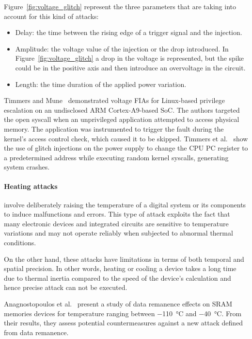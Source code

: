 Figure~\ref{fig:voltage_glitch} represent the three parameters that are taking into account for this kind of attacks:
\begin{itemize}
    \item Delay: the time between the rising edge of a trigger signal and the injection.
    \item Amplitude: the voltage value of the injection or the drop introduced. In Figure~\ref{fig:voltage_glitch} a drop in the voltage is represented, but the spike could be in the positive axis and then introduce an overvoltage in the circuit.
    \item Length: the time duration of the applied power variation.
\end{itemize}

Timmers and Mune~\cite{TM-17-fdtc} demonstrated voltage FIAs for Linux-based privilege escalation on an undisclosed ARM Cortex-A9-based SoC. The authors targeted the open syscall when an unprivileged application attempted to access physical memory. The application was instrumented to trigger the fault during the kernel’s access control check, which caused it to be skipped.
Timmers et al.~\cite{TSW-16-fdtc} show the use of glitch injections on the power supply to change the CPU PC register to a predetermined address while executing random kernel syscalls, generating system crashes.

\paragraph{Heating attacks} involve deliberately raising the temperature of a digital system or its components to induce malfunctions and errors. This type of attack exploits the fact that many electronic devices and integrated circuits are sensitive to temperature variations and may not operate reliably when subjected to abnormal thermal conditions.

On the other hand, these attacks have limitations in terms of both temporal and spatial precision. In other words, heating or cooling a device takes a long time due to thermal inertia compared to the speed of the device's calculation and hence precise attack can not be executed.

Anagnostopoulos et al.~\cite{AARSGK-18-dsd} present a study of data remanence effects on SRAM memories devices for temperature ranging between \SI{-110}{\degreeCelsius} and \SI{-40}{\degreeCelsius}. From their results, they assess potential countermeasures against a new attack defined from data remanence.

